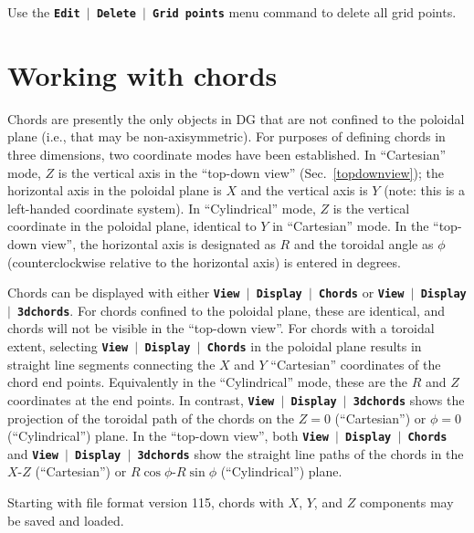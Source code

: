 \documentclass[12pt]{report}
\begin{document}
Use the
\textbf{\texttt{Edit  \begin{math}\vert{}\end{math}  Delete  \begin{math}\vert{}\end{math}  Grid
points}} menu command to delete all grid points.

\chapter{Working with chords}
\label{chords}

Chords are presently the only objects in DG that are not confined to the
poloidal plane (i.e., that may be non-axisymmetric).
For purposes of defining chords in three
dimensions, two coordinate
modes have been established. 
In ``Cartesian'' mode, $Z$ is the
vertical axis in the ``top-down view'' (Sec.~\ref{topdownview});
the horizontal axis in the poloidal plane is $X$ and the
vertical axis is $Y$ (note: this is a left-handed coordinate system).
In ``Cylindrical'' mode, $Z$ is the vertical coordinate in the poloidal
plane, identical to $Y$ in ``Cartesian'' mode. 
In the ``top-down view'',
the horizontal axis is
designated as $R$ and the toroidal angle as $\phi$ (counterclockwise relative
to the horizontal axis) is entered in degrees. 

Chords can be displayed with either 
\textbf{\texttt{View $\mid$ Display $\mid$ Chords}} or 
\textbf{\texttt{View $\mid$ Display $\mid$ 3dchords}}.  For chords
confined to the poloidal plane, these are identical, and chords will
not be visible in the ``top-down view''.  For chords with a toroidal
extent, selecting 
\textbf{\texttt{View $\mid$ Display $\mid$ Chords}} in the 
poloidal plane results in straight
line segments connecting the 
$X$ and $Y$ ``Cartesian'' coordinates of the chord end points.
Equivalently in the ``Cylindrical'' mode, these are the $R$
and $Z$ coordinates at the end points.  In contrast,
\textbf{\texttt{View $\mid$ Display $\mid$ 3dchords}} shows the projection
of the toroidal path of the chords on the $Z = 0$ (``Cartesian'')
or $\phi = 0$ (``Cylindrical'') plane.  In the ``top-down view'',
both \textbf{\texttt{View $\mid$ Display $\mid$ Chords}} and
\textbf{\texttt{View $\mid$ Display $\mid$ 3dchords}} show the straight
line paths of the chords in the $X$-$Z$ (``Cartesian'') or
$R \cos \phi$-$R \sin \phi$ (``Cylindrical'') plane.

Starting with file format version 115, chords with $X$, $Y$,
and $Z$
components may be saved and loaded.
\end{document}
